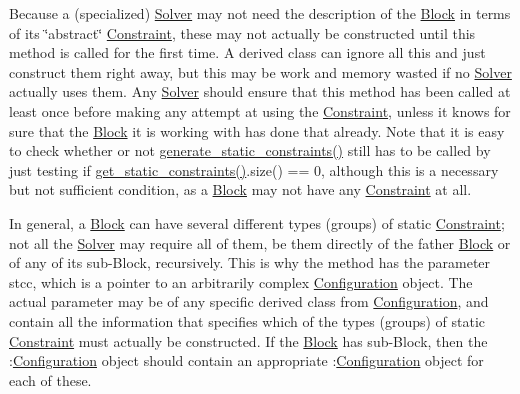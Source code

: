 Because a (specialized) \mbox{\hyperlink{class_s_m_spp__di__unipi__it_1_1_solver}{Solver}} may not need the description of the \mbox{\hyperlink{class_s_m_spp__di__unipi__it_1_1_block}{Block}} in terms of its \char`\"{}abstract\char`\"{} \mbox{\hyperlink{class_s_m_spp__di__unipi__it_1_1_constraint}{Constraint}}, these may not actually be constructed until this method is called for the first time. A derived class can ignore all this and just construct them right away, but this may be work and memory wasted if no \mbox{\hyperlink{class_s_m_spp__di__unipi__it_1_1_solver}{Solver}} actually uses them. Any \mbox{\hyperlink{class_s_m_spp__di__unipi__it_1_1_solver}{Solver}} should ensure that this method has been called at least once before making any attempt at using the \mbox{\hyperlink{class_s_m_spp__di__unipi__it_1_1_constraint}{Constraint}}, unless it knows for sure that the \mbox{\hyperlink{class_s_m_spp__di__unipi__it_1_1_block}{Block}} it is working with has done that already. Note that it is easy to check whether or not \mbox{\hyperlink{class_s_m_spp__di__unipi__it_1_1_block_add9b4c918157bda66b5183f67953d49b}{generate\+\_\+static\+\_\+constraints()}} still has to be called by just testing if \mbox{\hyperlink{class_s_m_spp__di__unipi__it_1_1_block_afaf2dca465cd70d9d76bcfe839e52aec}{get\+\_\+static\+\_\+constraints()}}.size() == 0, although this is a necessary but not sufficient condition, as a \mbox{\hyperlink{class_s_m_spp__di__unipi__it_1_1_block}{Block}} may not have any \mbox{\hyperlink{class_s_m_spp__di__unipi__it_1_1_constraint}{Constraint}} at all.

In general, a \mbox{\hyperlink{class_s_m_spp__di__unipi__it_1_1_block}{Block}} can have several different types (groups) of static \mbox{\hyperlink{class_s_m_spp__di__unipi__it_1_1_constraint}{Constraint}}; not all the \mbox{\hyperlink{class_s_m_spp__di__unipi__it_1_1_solver}{Solver}} may require all of them, be them directly of the father \mbox{\hyperlink{class_s_m_spp__di__unipi__it_1_1_block}{Block}} or of any of its sub-\/\+Block, recursively. This is why the method has the parameter stcc, which is a pointer to an arbitrarily complex \mbox{\hyperlink{class_s_m_spp__di__unipi__it_1_1_configuration}{Configuration}} object. The actual parameter may be of any specific derived class from \mbox{\hyperlink{class_s_m_spp__di__unipi__it_1_1_configuration}{Configuration}}, and contain all the information that specifies which of the types (groups) of static \mbox{\hyperlink{class_s_m_spp__di__unipi__it_1_1_constraint}{Constraint}} must actually be constructed. If the \mbox{\hyperlink{class_s_m_spp__di__unipi__it_1_1_block}{Block}} has sub-\/\+Block, then the \+:\mbox{\hyperlink{class_s_m_spp__di__unipi__it_1_1_configuration}{Configuration}} object should contain an appropriate \+:\mbox{\hyperlink{class_s_m_spp__di__unipi__it_1_1_configuration}{Configuration}} object for each of these.

